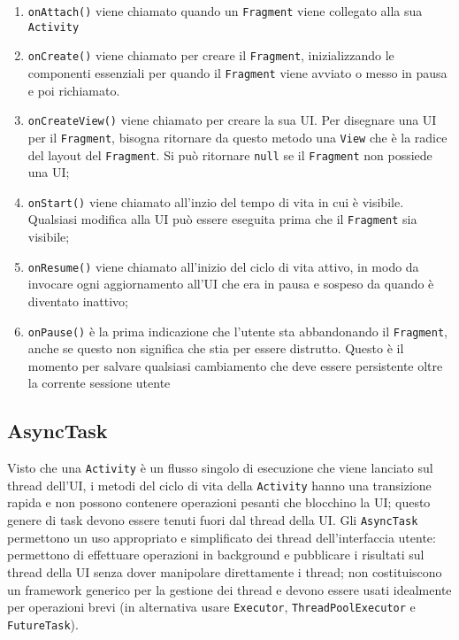 \begin{enumerate}
\item \texttt{onAttach()} viene chiamato quando un \texttt{Fragment} viene collegato alla sua \texttt{Activity}
\item \texttt{onCreate()} viene chiamato per creare il \texttt{Fragment}, inizializzando le componenti essenziali per quando il \texttt{Fragment} viene avviato o messo in pausa e poi richiamato.
\item \texttt{onCreateView()} viene chiamato per creare la sua UI. Per disegnare una UI per il \texttt{Fragment}, bisogna ritornare da questo metodo una \texttt{View} che è la radice del layout del \texttt{Fragment}. Si può ritornare \texttt{null} se il \texttt{Fragment} non possiede una UI;
\item \texttt{onStart()} viene chiamato all'inzio del tempo di vita in cui è visibile. Qualsiasi modifica alla UI può essere eseguita prima che il \texttt{Fragment} sia visibile;
\item \texttt{onResume()} viene chiamato all'inizio del ciclo di vita attivo, in modo da invocare ogni aggiornamento all'UI che era in pausa e sospeso da quando è diventato inattivo;
\item \texttt{onPause()} è la prima indicazione che l'utente sta abbandonando il \texttt{Fragment}, anche se questo non significa che stia per essere distrutto. Questo è il momento per salvare qualsiasi cambiamento che deve essere persistente oltre la corrente sessione utente 
\end{enumerate}


\subsection{AsyncTask}

Visto che una \texttt{Activity} è un flusso singolo di esecuzione che viene lanciato sul thread dell'UI, i metodi del ciclo di vita della \texttt{Activity} hanno una transizione rapida e non possono contenere operazioni pesanti che blocchino la UI; questo genere di task devono essere tenuti fuori dal thread della UI.
Gli \texttt{AsyncTask} permettono un uso appropriato e simplificato dei thread dell'interfaccia utente: permettono di effettuare operazioni in background e pubblicare i risultati sul thread della UI senza dover manipolare direttamente i thread; non costituiscono un framework generico per la gestione dei thread e devono essere usati idealmente per operazioni brevi (in alternativa usare \texttt{Executor}, \texttt{ThreadPoolExecutor} e \texttt{FutureTask}).

